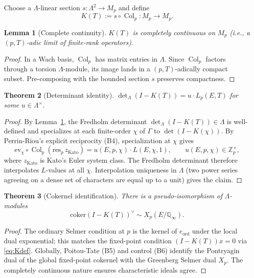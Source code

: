 \documentclass[12pt,reqno]{amsart}
\newtheorem{theorem}{Theorem}[section]
\newtheorem{lemma}[theorem]{Lemma}
\theoremstyle{definition}
\theoremstyle{remark}
\newcommand{\Q}{\mathbb{Q}}
\newcommand{\Zp}{\mathbb{Z}_p}
\newcommand{\Qinf}{\Q_\infty}
\newcommand{\Lam}{\Lambda}
\DeclareMathOperator{\Col}{Col}
\begin{document}
Choose a $\Lam$-linear section $s:\Lam^2\to M_p$ and define
\begin{equation}\label{eq:Kdef}
K(T):=s\circ\Col_p:M_p\longrightarrow M_p.
\end{equation}

\begin{lemma}[Complete continuity]\label{lem:compact}
$K(T)$ is completely continuous on $M_p$ (i.e., a $(p,T)$-adic limit of finite-rank operators).
\end{lemma}

\begin{proof}
In a Wach basis, $\Col_p$ has matrix entries in $\Lam$.  Since $\Col_p$ factors through a torsion $\Lam$-module, its image lands in a $(p,T)$-adically compact subset.  Pre-composing with the bounded section $s$ preserves compactness.
\end{proof}

\begin{theorem}[Determinant identity]\label{thm:det-Lp}
$\det_\Lam(I-K(T))=u\cdot L_p(E,T)$ for some $u\in\Lam^\times$.
\end{theorem}

\begin{proof}
By Lemma~\ref{lem:compact}, the Fredholm determinant $\det_\Lam(I-K(T))\in\Lam$ is well-defined and specializes at each finite-order $\chi$ of $\Gamma$ to $\det(I-K(\chi))$.  By Perrin-Riou's explicit reciprocity (B4), specialization at $\chi$ gives
\[
\mathrm{ev}_\chi\circ\Col_p(\mathrm{res}_p\,z_{\mathrm{Kato}})=u(E,p,\chi)\cdot L(E,\chi,1),\qquad u(E,p,\chi)\in\Zp^\times,
\]
where $z_{\mathrm{Kato}}$ is Kato's Euler system class.  The Fredholm determinant therefore interpolates $L$-values at all $\chi$.  Interpolation uniqueness in $\Lam$ (two power series agreeing on a dense set of characters are equal up to a unit) gives the claim.
\end{proof}

\begin{theorem}[Cokernel identification]\label{thm:coker-selmer}
There is a pseudo-isomorphism of $\Lam$-modules
\[
\mathrm{coker}(I-K(T))^\vee\sim X_p(E/\Qinf).
\]
\end{theorem}

\begin{proof}
The ordinary Selmer condition at $p$ is the kernel of $e_{\mathrm{ord}}$ under the local dual exponential; this matches the fixed-point condition $(I-K(T))x=0$ via \eqref{eq:Kdef}.  Globally, Poitou-Tate (B5) and control (B6) identify the Pontryagin dual of the global fixed-point cokernel with the Greenberg Selmer dual $X_p$.  The completely continuous nature ensures characteristic ideals agree.
\end{proof}
\end{document}
